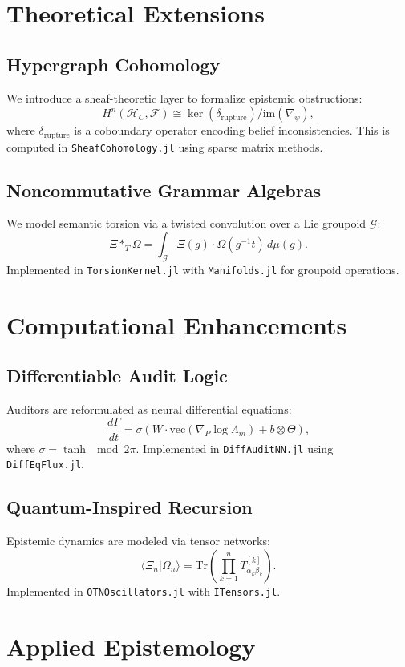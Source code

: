 \documentclass[12pt]{article}
\begin{document}
\section{Theoretical Extensions}
\subsection{Hypergraph Cohomology}
We introduce a sheaf-theoretic layer to formalize epistemic obstructions:
\[
H^n(\mathcal{H}_C, \mathcal{F}) \cong \ker(\delta_{\text{rupture}}) / \text{im}(\nabla_\psi),
\]
where \(\delta_{\text{rupture}}\) is a coboundary operator encoding belief inconsistencies. This is computed in \texttt{SheafCohomology.jl} using sparse matrix methods.

\subsection{Noncommutative Grammar Algebras}
We model semantic torsion via a twisted convolution over a Lie groupoid \(\mathcal{G}\):
\[
\Xi \ast_T \Omega = \int_\mathcal{G} \Xi(g) \cdot \Omega(g^{-1}t) \, d\mu(g).
\]
Implemented in \texttt{TorsionKernel.jl} with \texttt{Manifolds.jl} for groupoid operations.

\section{Computational Enhancements}
\subsection{Differentiable Audit Logic}
Auditors are reformulated as neural differential equations:
\[
\frac{d\Gamma}{dt} = \sigma(W \cdot \text{vec}(\nabla_P \log \Lambda_m) + b \otimes \Theta),
\]
where \(\sigma = \tanh \mod 2\pi\). Implemented in \texttt{DiffAuditNN.jl} using \texttt{DiffEqFlux.jl}.

\subsection{Quantum-Inspired Recursion}
Epistemic dynamics are modeled via tensor networks:
\[
\langle \Xi_n | \Omega_n \rangle = \text{Tr} \left( \prod_{k=1}^n T_{\alpha_k \beta_k}^{[k]} \right).
\]
Implemented in \texttt{QTNOscillators.jl} with \texttt{ITensors.jl}.

\section{Applied Epistemology}
\end{document}
